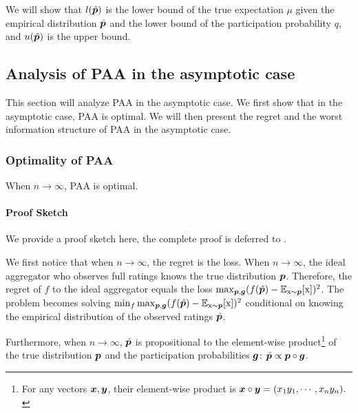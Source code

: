 We will show that $l(\hat{{\bm{p}}})$ is the lower bound of the true expectation $\mu$ given the empirical distribution $\hat{{\bm{p}}}$ and the lower bound of the participation probability $q$, and $u(\hat{{\bm{p}}})$ is the upper bound. 

\subsection{Analysis of PAA in the asymptotic case}

This section will analyze PAA in the asymptotic case. We first show that in the asymptotic case, PAA is optimal. We will then present the regret and the worst information structure of PAA in the asymptotic case.

\subsubsection{Optimality of PAA}

\begin{theorem}\label{thm:PAA}
    When $n\to\infty$, PAA is optimal.
\end{theorem}



\paragraph{Proof Sketch}
We provide a proof sketch here, the complete proof is deferred to . 

We first notice that when $n\to\infty$, the regret is the loss. When $n\to\infty$, the ideal aggregator who observes full ratings knows the true distribution ${\bm{p}}$. Therefore, the regret of $f$ to the ideal aggregator equals the loss $\max_{{\bm{p}},{\bm{g}}}(f(\hat{{\bm{p}}})-\mathbb{E}_{{\textnormal{x}}\sim{\bm{p}}}[{\textnormal{x}}])^2$. The problem becomes solving $\min_f\max_{{\bm{p}},{\bm{g}}}(f(\hat{{\bm{p}}})-\mathbb{E}_{{\textnormal{x}}\sim{\bm{p}}}[{\textnormal{x}}])^2$ conditional on knowing the empirical distribution of the observed ratings $\hat{{\bm{p}}}$. 

Furthermore, when $n\to\infty$, $\hat{{\bm{p}}}$ is propositional to the element-wise product\footnote{For any vectors ${\bm{x}},{\bm{y}}$, their element-wise product is ${\bm{x}}\circ{\bm{y}}=(x_1y_1,\cdots,x_ny_n).$} of the true distribution ${\bm{p}}$ and the participation probabilities ${\bm{g}}$: $\hat{{\bm{p}}}\propto {\bm{p}}\circ{\bm{g}}$. 



